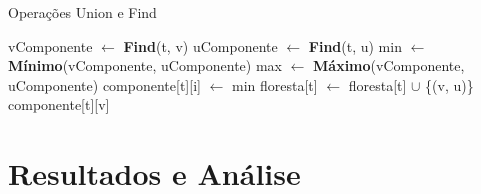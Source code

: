 \documentclass[12pt]{article}
\begin{document}
\begin{algorithm}[h]
    \DontPrintSemicolon
    \caption{Operações Union e Find}
    {
        vComponente $\gets$ \textbf{Find}(t, v)\;
        uComponente $\gets$ \textbf{Find}(t, u)\;
        min $\gets$ \textbf{Mínimo}(vComponente, uComponente)\;
		max $\gets$ \textbf{Máximo}(vComponente, uComponente)\;
        {
            {
                {
                    componente[t][i] $\gets$ min\;
                }
            }
            floresta[t] $\gets$ floresta[t] $\cup$ \{(v, u)\}\;
        }
    }
    {
        \Return componente[t][v]\;
    }
\end{algorithm}

\section{Resultados e Análise}
\end{document}
